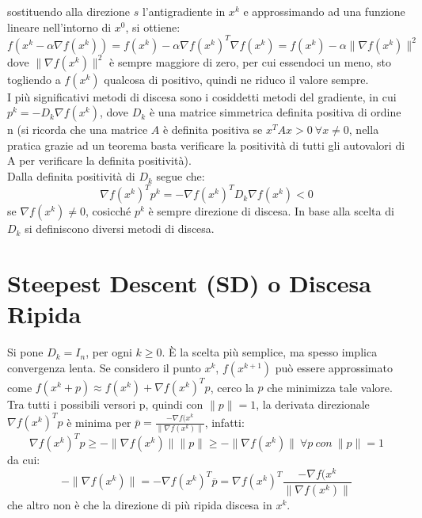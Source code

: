 \documentclass{report}
\begin{document}
sostituendo alla direzione $s$ l'antigradiente in $x^k$ e approssimando ad una funzione lineare nell'intorno di $x^0$, si ottiene:
\begin{equation}
    \label{dimostrazione_discesa}
     f(x^k - \alpha \nabla f(x^k)) = f(x^k) -\alpha\nabla  f(x^k)^T \nabla f(x^k)=f(x^k) -\alpha\|\nabla  f(x^k)\|^2
\end{equation}
dove $\|\nabla  f(x^k)\|^2$ è sempre maggiore di zero, per cui essendoci un meno, sto togliendo a $ f(x^k)$ qualcosa di positivo, quindi ne riduco il valore sempre.
\\
I più significativi metodi di discesa sono i cosiddetti metodi del gradiente, in cui $p^k = -D_k \nabla f(x^k)$, dove $D_k$ è una matrice simmetrica definita positiva di ordine n (si ricorda che una matrice $A$ è definita positiva se $x^T A x > 0 \ \forall x \ne 0$, nella pratica grazie ad un teorema basta verificare la positività di tutti gli autovalori di A per verificare la definita positività).\\
Dalla definita positività di $D_k$ segue che:
\begin{equation}
    \label{discesa_metodo_grad}
     \nabla  f(x^k)^T  p^k = -\nabla f(x^k)^T  D_k \nabla f(x^k) < 0
\end{equation}
se $\nabla f(x^k) \ne 0$, cosicché $p^k$ è sempre direzione di discesa.
In base alla scelta di $D_k$ si definiscono diversi metodi di discesa.


\section{Steepest Descent (SD) o Discesa Ripida}
Si pone $D_k = I_n$, per ogni $k \geqslant 0$. \`E la scelta più semplice, ma spesso implica convergenza lenta. Se considero il punto $x^k$, $f(x^{k+1})$ può essere approssimato come $f(x^k + p) 	\approx f(x^k) + \nabla f(x^k)^T p$, cerco la $p$ che minimizza tale valore. Tra tutti i possibili versori p, quindi con $\| p\| = 1$,  la derivata direzionale $ \nabla f(x^k)^T p$ è minima per $\overline{p} = \frac{-\nabla f(x^k}{\| \nabla f(x^k) \|}$, infatti:
\begin{equation}
    \label{SD1}
     \nabla f(x^k)^T p \geqslant - \| \nabla f(x^k)\| \| p \| \geqslant - \| \nabla f(x^k)\| \ \forall p \ con \ \|p\|=1
\end{equation}
da cui: 
\begin{equation}
    \label{SD2}
     -\| \nabla f(x^k)\| = -\nabla f(x^k)^T \overline{p} = \nabla f(x^k)^T \frac{-\nabla f(x^k}{\| \nabla f(x^k) \|}
\end{equation}
che altro non è che la direzione di più ripida discesa in $x^k$.
\end{document}
